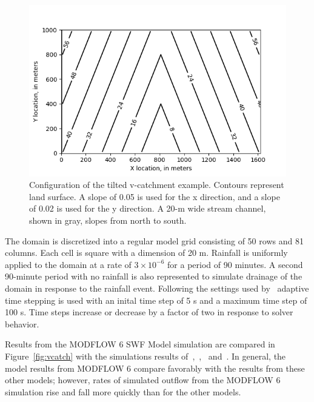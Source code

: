 \documentclass[fleqn]{article}
\begin{document}
\begin{figure}
	\centering
	\includegraphics[scale=0.75]{figures/vcatch-surface.png}
	\caption[Configuration of the tilted v-catchment example.]{Configuration of the tilted v-catchment example.  Contours represent land surface.  A slope of 0.05 is used for the x direction, and a slope of 0.02 is used for the y direction.  A 20-m wide stream channel, shown in gray, slopes from north to south.}
	\label{fig:vcatch-surface}
\end{figure}

The domain is discretized into a regular model grid consisting of 50 rows and 81 columns.  Each cell is square with a dimension of 20 m.  Rainfall is uniformly applied to the domain at a rate of $3 \times 10^{-6}$ for a period of 90 minutes.  A second 90-minute period with no rainfall is also represented to simulate drainage of the domain in response to the rainfall event.  Following the settings used by~\cite{panday2004} adaptive time stepping is used with an inital time step of 5 s and a maximum time step of 100 s.  Time steps increase or decrease by a factor of two in response to solver behavior.

Results from the MODFLOW 6 SWF Model simulation are compared in Figure~\ref{fig:vcatch} with the simulations results of~\cite{digiammarco1996},~\cite{VanderKwaak1999},~\cite{panday2004} and~\cite{hughes2015}.  In general, the model results from MODFLOW 6 compare favorably with the results from these other models; however, rates of simulated outflow from the MODFLOW 6 simulation rise and fall more quickly than for the other models.
\end{document}

